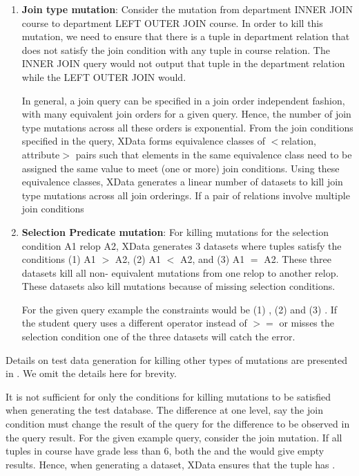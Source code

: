 \begin{enumerate}
\item \textbf{Join type mutation}: Consider the
mutation from department INNER JOIN course to
department LEFT OUTER JOIN course. In order to
kill this mutation, we need to ensure that there is a
tuple in department relation that does not satisfy the
join condition with any tuple in course relation. The
INNER JOIN query would not output that tuple in
the department relation while the LEFT OUTER
JOIN would.

In general, a join query can be specified in a join order
independent fashion, with many equivalent join orders for a given query. Hence, the number of join type
mutations across all these orders is exponential. From
the join conditions specified in the query, XData
forms equivalence classes of $<$relation, attribute$>$
pairs such that elements in the same equivalence
class need to be assigned the same value to meet
(one or more) join conditions. Using these equivalence
classes, XData generates a linear number of datasets
to kill join type mutations across all join orderings.
If a pair of relations involve multiple join conditions
\item \textbf{Selection Predicate mutation}: For killing mutations for the selection condition A1 relop A2, XData
generates 3 datasets where tuples satisfy the conditions (1) A1 $>$ A2, (2) A1 $<$ A2,
and (3) A1 $=$ A2. These three datasets kill all non-
equivalent mutations from one relop to another relop. These datasets also kill mutations because of missing
selection conditions. 

For the given query example the constraints would be (1) , (2)  and (3) . If the student query uses a different operator instead of $>=$ or misses the selection condition one of the three datasets will catch the error.
\end{enumerate}

Details on test data generation for killing other types of mutations are presented in \cite{xdata:vldbj15}. We omit the details here for brevity. 

It is not sufficient for only the conditions for killing mutations to be satisfied when generating the test database. The difference at one level, say the join condition must change the result of the query for the difference to be observed in the query result. For the given example query, consider the join mutation. If all tuples in course have grade less than 6, both the  and the  would give empty results. Hence, when generating a dataset, XData ensures that the tuple has . 

